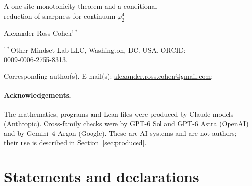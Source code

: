 \documentclass[11pt,a4paper]{article}
\theoremstyle{plain}
\theoremstyle{definition}
\theoremstyle{remark}
\begin{document}
\thispagestyle{plain}
\vspace*{2.5cm}
\begin{center}
{\LARGE A one-site monotonicity theorem and a conditional\\[4pt] reduction of sharpness for continuum $\varphi^4_2$\par}
\vspace{1.6em}
{\large Alexander Ross Cohen$^{1*}$\par}
\vspace{1.2em}
{\normalsize $^{1*}$Other Mindset Lab LLC, Washington, DC, USA. ORCID:\\ 0009-0006-2755-8313.\par}
\vspace{2em}
{\normalsize Corresponding author(s). E-mail(s): \href{mailto:alexander.ross.cohen@gmail.com}{alexander.ross.cohen@gmail.com};\par}
\end{center}
\vspace{1.5em}
\begin{abstract}
\noindent

\medskip
\noindent\textbf{Keywords:} $\varphi^4_2$ field theory, sharpness of phase transition, spontaneous magnetisation, correlation inequalities, differential inequalities, formal verification, AI-assisted research

\medskip
\noindent\textbf{MSC Classification:} 82B20, 81T08, 60K35, 03B35
\end{abstract}
\clearpage



\paragraph{Acknowledgements.} The mathematics, programs and Lean files were produced by Claude models (Anthropic). Cross-family checks were by GPT-6 Sol and GPT-6 Astra (OpenAI) and by Gemini~4 Argon (Google). These are AI systems and are not authors; their use is described in Section~\ref{sec:produced}.

\section*{Statements and declarations}




\end{document}
